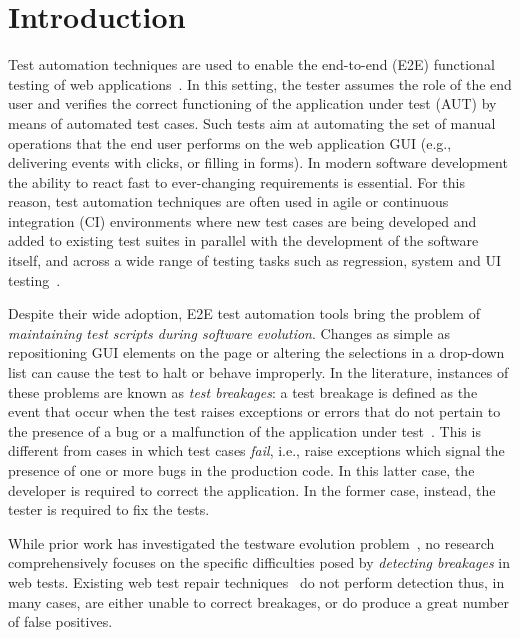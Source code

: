 \section{Introduction}\label{sec:introduction}

Test automation techniques are used to enable the end-to-end (E2E) functional testing of web applications~\cite{DBLP:journals/ac/TonellaRM14}. 
In this setting, the tester assumes the role of the end user and verifies the correct functioning of the application under test (AUT) by means of automated test cases. Such tests aim at automating the set of manual operations that the end user  performs on the web application GUI (e.g., delivering events with clicks, or filling in forms). 
In modern software development the ability to react fast to ever-changing requirements is essential. For this reason, test automation techniques are often used in agile or continuous integration (CI) environments where new test cases are being developed and added to existing test suites in parallel with the development of the software itself, and across a wide range of testing tasks such as regression, system and UI testing~\cite{STVR:STVR121,Fewster,Ramler:2006:EPT:1138929.1138946,Nguyen2014,7381848}.


Despite their wide adoption, E2E test automation tools bring the problem of \textit{maintaining test scripts during software evolution}. Changes as simple as repositioning GUI elements on the page or altering the selections in a drop-down list can cause the test to halt or behave improperly. 
In the literature, instances of these problems are known as \textit{test breakages}: a test breakage is defined as the event that occur when the test raises exceptions or errors that do not pertain to the presence of a bug or a malfunction of the application under test~\cite{Daniel:2011:AGR:2002931.2002937,Daniel:2009:RSR:1747491.1747538,Daniel:2010:TRU:1831708.1831734,Hammoudi-2016-ICST}. 
This is different from cases in which test cases \textit{fail}, i.e., raise exceptions which signal the presence of one or more bugs in the production code. In this latter case, the developer is required to correct the application. In the former case, instead, the tester is required to fix the tests. %


While prior work has investigated the testware evolution problem~\cite{2016-leotta-Advances,2014-leotta-WoSAR,2015-leotta-ICST,Thummalapenta:2013:ECT:2486788.2486926,Yandrapally:2014:RTA:2610384.2610390,Choudhary:2011:WWA:2002931.2002935,Hammoudi-2016-FSE}, 
no research comprehensively focuses on the specific difficulties posed by \textit{detecting breakages} in web tests. 
Existing web test repair techniques~\cite{Choudhary:2011:WWA:2002931.2002935,Hammoudi-2016-FSE,2015-leotta-ICST} do not perform detection thus, in many cases, are either unable to correct breakages, or do produce a great number of false positives. 

